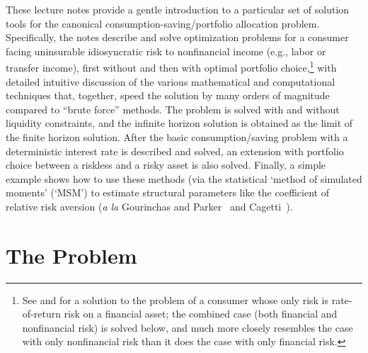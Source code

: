 \documentclass[titlepage, headings=optiontotocandhead]{\econtex}
\begin{document}

  These lecture notes provide a gentle introduction to a particular set
  of solution tools for the canonical consumption-saving/portfolio allocation problem.
  Specifically, the notes describe and solve optimization problems for a
  consumer facing uninsurable idiosyncratic risk to nonfinancial income
  (e.g., labor or transfer income), first without and then with optimal portfolio choice,\footnote{See
    \cite{merton:restat} and \cite{samuelson:portfolio} for a solution
    to the problem of a consumer whose only risk is rate-of-return risk
    on a financial asset; the combined case (both financial and
    nonfinancial risk) is solved below, and much more closely resembles
    the case with only nonfinancial risk than it does the case with only
    financial risk.}  with detailed intuitive discussion of the various
  mathematical and computational techniques that, together, speed the
  solution by many orders of magnitude compared to
  ``brute force'' methods.  The problem is solved with and without
  liquidity constraints, and the infinite horizon solution is
  obtained as the limit of the finite horizon solution.  After the basic
  consumption/saving problem with a deterministic interest rate is
  described and solved, an extension with portfolio choice between a
  riskless and a risky asset is also solved.  Finally, a simple example
    shows how to use these methods (via the statistical `method
    of simulated moments' (`MSM') to estimate structural parameters like the
    coefficient of relative risk aversion (\textit{a la} Gourinchas and
    Parker~\citeyearpar{gpLifecycle} and
    Cagetti~\citeyearpar{cagettiWprofiles}).  %

    \renewcommand{\DiscAlt}{\beta} %
    \hypertarget{the-problem}{}
    \section{The Problem}\label{sec:the-problem}
\end{document}
